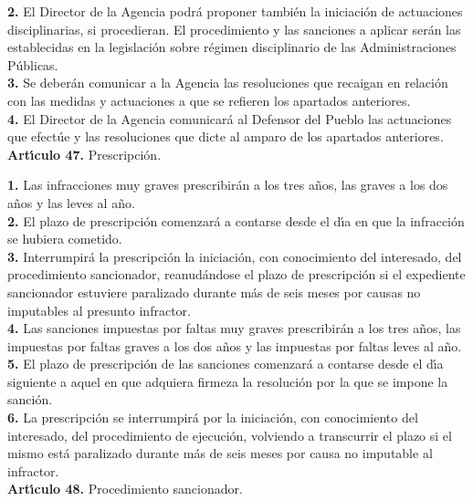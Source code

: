 {\bf 2.} El Director de la Agencia podr\'a proponer tambi\'en la
iniciaci\'on de actuaciones disciplinarias, si procedieran. El
procedimiento y las sanciones a aplicar ser\'an las establecidas en
la legislaci\'on sobre r\'egimen disciplinario de las Administraciones
P\'ublicas.\\

{\bf 3.} Se deber\'an comunicar a la Agencia las resoluciones que
recaigan en relaci\'on con las medidas y actuaciones a que se refieren
los apartados anteriores.\\

{\bf 4.} El Director de la Agencia comunicar\'a al Defensor del Pueblo
las actuaciones que efect\'ue y las resoluciones que dicte al amparo
de los apartados anteriores.
\vspace{0.3cm}\\
{\large {\bf Art\'{\i}culo 47.} Prescripci\'on.}

{\bf 1.} Las infracciones muy graves prescribir\'an a los tres a\~nos,
las graves a los dos a\~nos y las leves al a\~no.\\

{\bf 2.} El plazo de prescripci\'on comenzar\'a a contarse desde el
d\'{\i}a en que la infracci\'on se hubiera cometido.\\

{\bf 3.} Interrumpir\'a la prescripci\'on la iniciaci\'on,
con conocimiento del interesado, del procedimiento sancionador,
reanud\'andose el plazo de prescripci\'on si el expediente sancionador
estuviere paralizado durante m\'as de seis meses por causas no imputables
al presunto infractor.\\

{\bf 4.} Las sanciones impuestas por faltas muy graves prescribir\'an
a los tres a\~nos, las impuestas por faltas graves a los dos a\~nos y
las impuestas por faltas leves al a\~no.\\

{\bf 5.} El plazo de prescripci\'on de las sanciones comenzar\'a a
contarse desde el d\'{\i}a siguiente a aquel en que adquiera firmeza la
resoluci\'on por la que se impone la sanci\'on.\\

{\bf 6.} La prescripci\'on se interrumpir\'a por la iniciaci\'on,
con conocimiento del interesado, del procedimiento de ejecuci\'on,
volviendo a transcurrir el plazo si el mismo est\'a paralizado durante
m\'as de seis meses por causa no imputable al infractor.
\vspace{0.3cm}\\
{\large {\bf Art\'{\i}culo 48.} Procedimiento sancionador.}

